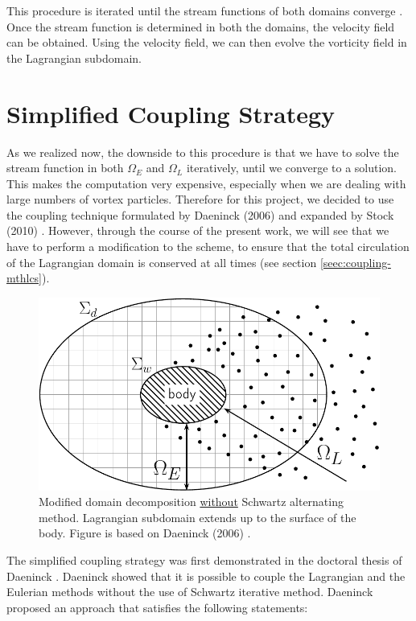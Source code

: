 	This procedure is iterated until the stream functions of both domains converge \cite{Ould-Salihi2001a}. Once the stream function is determined in both the domains, the velocity field can be obtained. Using the velocity field, we can then evolve the vorticity field in the Lagrangian subdomain.

	\section{Simplified Coupling Strategy}
	\label{sec:helvpm-scs}
	
	As we realized now, the downside to this procedure is that we have to solve the stream function in both $\Omega_E$ and $\Omega_L$ iteratively, until we converge to a solution. This makes the computation very expensive, especially when we are dealing with large numbers of vortex particles. Therefore for this project, we decided to use the coupling technique formulated by Daeninck (2006) \cite{Daeninck2006} and expanded by Stock (2010) \cite{Stock2010a}. However, through the course of the present work, we will see that we have to perform a modification to the scheme, to ensure that the total circulation of the Lagrangian domain is conserved at all times (see section \ref{seec:coupling-mthlcs}).	
	

		\begin{figure}[!h]
			\centering
			\includegraphics[width=0.6\linewidth]{figures/hybrid/domainDecomposition_daenick_type2-crop.pdf}
			\caption{Modified domain decomposition \underline{without} Schwartz alternating method. Lagrangian subdomain extends up to the surface of the body. Figure is based on Daeninck (2006) \cite{Daeninck2006}.}
			\label{fig:domainDecomposition_daenick}
		\end{figure}
	
	The simplified coupling strategy was first demonstrated in the doctoral thesis of Daeninck \cite{Daeninck2006}. Daeninck showed that it is possible to couple the Lagrangian and the Eulerian methods without the use of Schwartz iterative method. Daeninck proposed an approach that satisfies the following statements:
	
